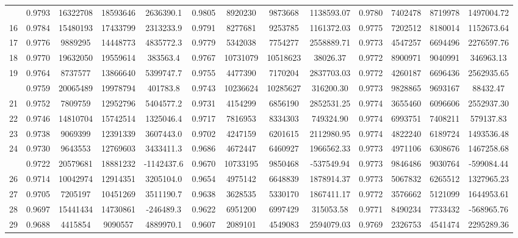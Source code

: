 \documentclass[
  12pt,
]{article}
\begin{document}
\begin{longtable}[t]{lcccccccccccc}
\addlinespace
15 & 0.9793 & 16322708 & 18593646 & 2636390.1 & 0.9805 & 8920230 & 9873668 & 1138593.07 & 0.9780 & 7402478 & 8719978 & 1497004.72\\
16 & 0.9784 & 15480193 & 17433799 & 2313233.9 & 0.9791 & 8277681 & 9253785 & 1161372.03 & 0.9775 & 7202512 & 8180014 & 1152673.64\\
17 & 0.9776 & 9889295 & 14448773 & 4835772.3 & 0.9779 & 5342038 & 7754277 & 2558889.71 & 0.9773 & 4547257 & 6694496 & 2276597.76\\
18 & 0.9770 & 19632050 & 19559614 & 383563.4 & 0.9767 & 10731079 & 10518623 & 38026.37 & 0.9772 & 8900971 & 9040991 & 346963.13\\
19 & 0.9764 & 8737577 & 13866640 & 5399747.7 & 0.9755 & 4477390 & 7170204 & 2837703.03 & 0.9772 & 4260187 & 6696436 & 2562935.65\\
\addlinespace
20 & 0.9759 & 20065489 & 19978794 & 401783.8 & 0.9743 & 10236624 & 10285627 & 316200.30 & 0.9773 & 9828865 & 9693167 & 88432.47\\
21 & 0.9752 & 7809759 & 12952796 & 5404577.2 & 0.9731 & 4154299 & 6856190 & 2852531.25 & 0.9774 & 3655460 & 6096606 & 2552937.30\\
22 & 0.9746 & 14810704 & 15742514 & 1325046.4 & 0.9717 & 7816953 & 8334303 & 749324.90 & 0.9774 & 6993751 & 7408211 & 579137.83\\
23 & 0.9738 & 9069399 & 12391339 & 3607443.0 & 0.9702 & 4247159 & 6201615 & 2112980.95 & 0.9774 & 4822240 & 6189724 & 1493536.48\\
24 & 0.9730 & 9643553 & 12769603 & 3433411.3 & 0.9686 & 4672447 & 6460927 & 1966562.33 & 0.9773 & 4971106 & 6308676 & 1467258.68\\
\addlinespace
25 & 0.9722 & 20579681 & 18881232 & -1142437.6 & 0.9670 & 10733195 & 9850468 & -537549.94 & 0.9773 & 9846486 & 9030764 & -599084.44\\
26 & 0.9714 & 10042974 & 12914351 & 3205104.0 & 0.9654 & 4975142 & 6648839 & 1878914.37 & 0.9773 & 5067832 & 6265512 & 1327965.23\\
27 & 0.9705 & 7205197 & 10451269 & 3511190.7 & 0.9638 & 3628535 & 5330170 & 1867411.17 & 0.9772 & 3576662 & 5121099 & 1644953.61\\
28 & 0.9697 & 15441434 & 14730861 & -246489.3 & 0.9622 & 6951200 & 6997429 & 315053.58 & 0.9771 & 8490234 & 7733432 & -568965.76\\
29 & 0.9688 & 4415854 & 9090557 & 4889970.1 & 0.9607 & 2089101 & 4549083 & 2594079.03 & 0.9769 & 2326753 & 4541474 & 2295289.36\\

\end{longtable}
\end{document}
